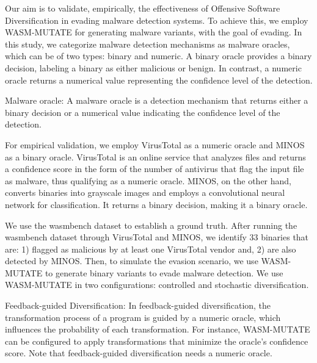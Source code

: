 
Our aim is to validate, empirically, the effectiveness of Offensive Software Diversification in evading malware detection systems.
To achieve this, we employ WASM-MUTATE for generating \Wasm malware variants, with the goal of evading.
In this study, we categorize malware detection mechanisms as malware oracles, which can be of two types: binary and numeric. 
A binary oracle provides a binary decision, labeling a \Wasm binary as either malicious or benign. 
In contrast, a numeric oracle returns a numerical value representing the confidence level of the detection.

\begin{definition}{Malware oracle:}
    \label{malware_oracle_def}
    A malware oracle is a detection mechanism that returns either a binary decision or a numerical value indicating the confidence level of the detection.
\end{definition}


For empirical validation, we employ VirusTotal as a numeric oracle and MINOS \cite{MINOS} as a binary oracle. 
VirusTotal is an online service that analyzes files and returns a confidence score in the form of the number of antivirus that flag the input file as malware, thus qualifying as a numeric oracle. 
MINOS, on the other hand, converts \Wasm binaries into grayscale images and employs a convolutional neural network for classification. 
It returns a binary decision, making it a binary oracle.


We use the wasmbench dataset \cite{Hilbig2021AnES} to establish a ground truth. 
After running the wasmbench dataset through VirusTotal and MINOS, we identify 33 binaries that are: 1) flagged as malicious by at least one VirusTotal vendor and, 2) are also detected by MINOS.
Then, to simulate the evasion scenario, we use WASM-MUTATE to generate \Wasm binary variants to evade malware detection.
We use WASM-MUTATE in two configurations: controlled and stochastic diversification.

\begin{definition}{Feedback-guided Diversification:}
    \label{controlled_def}
    In feedback-guided diversification, the transformation process of a \Wasm program is guided by a numeric oracle, which influences the probability of each transformation. For instance, WASM-MUTATE can be configured to apply transformations that minimize the oracle's confidence score. Note that feedback-guided diversification needs a numeric oracle.
\end{definition}


